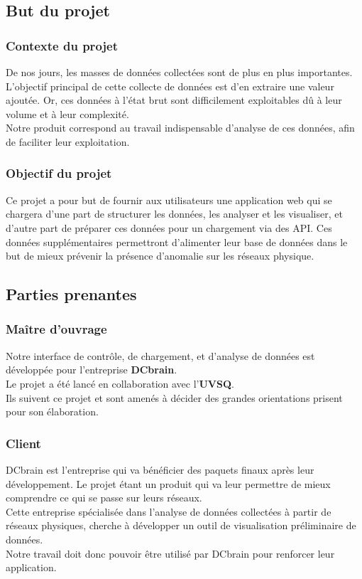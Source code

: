 		\subsection{But du projet}
			\subsubsection{Contexte du projet}
			De nos jours, les masses de données collectées sont de plus en plus importantes. L'objectif principal de cette collecte de données est d'en extraire une valeur ajoutée. Or, ces données à l'état brut sont difficilement exploitables dû à leur volume et à leur complexité.\\
			Notre produit correspond au travail indispensable d'analyse de ces données, afin de faciliter leur exploitation.
			\subsubsection{Objectif du projet}
			Ce projet a pour but de fournir aux utilisateurs une application web qui se chargera d'une part de structurer les données, les analyser et les visualiser, et d'autre part de préparer ces données pour un chargement via des API. Ces données supplémentaires permettront d'alimenter leur base de données dans le but de mieux prévenir la présence d'anomalie sur les réseaux physique.
		
		\subsection{Parties prenantes}
			\subsubsection{Maître d'ouvrage}
			Notre interface de contrôle, de chargement, et d'analyse de données est développée pour l'entreprise \textbf{DCbrain}.\\
			Le projet a été lancé en collaboration avec l'\textbf{UVSQ}.\\
			Ils suivent ce projet et sont amenés à décider des grandes orientations prisent pour son élaboration.
			
			\subsubsection{Client}
			DCbrain est l'entreprise qui va bénéficier des paquets finaux après leur développement. Le projet étant un produit qui va leur permettre de mieux comprendre ce qui se passe sur leurs réseaux.\\
			Cette entreprise spécialisée dans l'analyse de données collectées à partir de réseaux physiques, cherche à développer un outil de visualisation préliminaire de données.\\
			Notre travail doit donc pouvoir être utilisé par DCbrain pour renforcer leur application.
			
